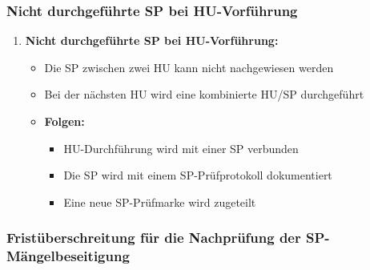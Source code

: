 \documentclass{vorlage-design-main}
\begin{document}
\subsubsection{Nicht durchgeführte SP bei
HU-Vorführung}\label{nicht-durchgefuehrte-sp-bei-hu-vorfuehrung}

\begin{enumerate}
\def\labelenumi{\arabic{enumi}.}

\item
  \textbf{Nicht durchgeführte SP bei HU-Vorführung:}

  \begin{itemize}

  \item
    Die SP zwischen zwei HU kann nicht nachgewiesen werden
  \item
    Bei der nächsten HU wird eine kombinierte HU/SP durchgeführt
  \item
    \textbf{Folgen:}

    \begin{itemize}

    \item
      HU-Durchführung wird mit einer SP verbunden
    \item
      Die SP wird mit einem SP-Prüfprotokoll dokumentiert
    \item
      Eine neue SP-Prüfmarke wird zugeteilt
    \end{itemize}
  \end{itemize}
\end{enumerate}

\subsubsection{Fristüberschreitung für die Nachprüfung der
SP-Mängelbeseitigung}\label{fristueberschreitung-fuer-die-nachpruefung-der-sp-maengelbeseitigung}
\end{document}
